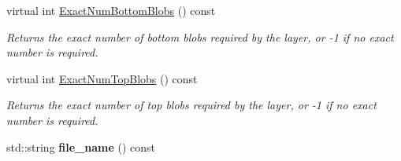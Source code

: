 \begin{DoxyCompactItemize}
virtual int \mbox{\hyperlink{classcaffe_1_1_h_d_f5_output_layer_a92fb5561414d7e8b8845b0279b1ee847}{Exact\+Num\+Bottom\+Blobs}} () const
\begin{DoxyCompactList}\small\item\em Returns the exact number of bottom blobs required by the layer, or -\/1 if no exact number is required. \end{DoxyCompactList}\item 
virtual int \mbox{\hyperlink{classcaffe_1_1_h_d_f5_output_layer_ad11b8da0a6217a0f9a63789b360b1c99}{Exact\+Num\+Top\+Blobs}} () const
\begin{DoxyCompactList}\small\item\em Returns the exact number of top blobs required by the layer, or -\/1 if no exact number is required. \end{DoxyCompactList}\item 
\mbox{\label{classcaffe_1_1_h_d_f5_output_layer_a94e43437239c6235f36922aaeac861e1}} 
std\+::string {\bfseries file\+\_\+name} () const
\end{DoxyCompactItemize}
